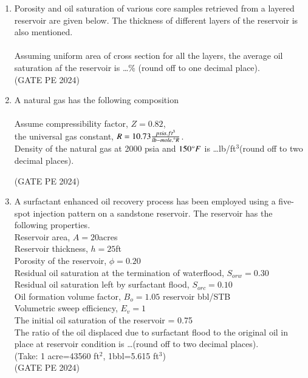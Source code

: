 \documentclass[journal,12pt,onecolumn]{IEEEtran}
\theoremstyle{remark}
\begin{document}
\begin{enumerate}
\item Porosity and oil saturation of various core samples retrieved from a layered reservoir are given below. The thickness of different layers of the reservoir is also mentioned.\\
\\
Assuming uniform area of cross section for all the layers, the average oil saturation af the reservoir is \dots \% (round off to one decimal place).\\

\hfill{(GATE PE 2024)}

\item A natural gas has the following composition\\
\\
Assume compressibility factor, $Z=0.82$,\\
the universal gas constant, $R=10.73\frac{psia.ft^3}{lb-mole.\degree R}$.\\
Density of the natural gas at 2000 psia and $150\degree F$ is \dots lb/ft$^3$(round off to two decimal places).

\hfill{(GATE PE 2024)}

\item A surfactant enhanced oil recovery process has been employed using a five-spot injection pattern on a sandstone reservoir. The reservoir has the following properties.\\
Reservoir area, $A=20$acres\\
Reservoir thickness, $h=25$ft\\
Porosity of the reservoir, $\phi = 0.20$\\
Residual oil saturation at the termination of waterflood, $S_{orw}=0.30$\\
Residual oil saturation left by surfactant flood, $S_{orc}=0.10$\\
Oil formation volume factor, $B_o=1.05$ reservoir bbl/STB\\
Volumetric sweep efficiency, $E_v=1$\\
The initial oil saturation of the reservoir = 0.75\\
The ratio of the oil displaced due to surfactant flood to the original oil in place at reservoir condition is \dots (round off to two decimal places).\\
(Take: 1 acre=43560 ft$^2$, 1bbl=5.615 ft$^3$)\\

\hfill{(GATE PE 2024)}


\end{enumerate}
\end{document}
